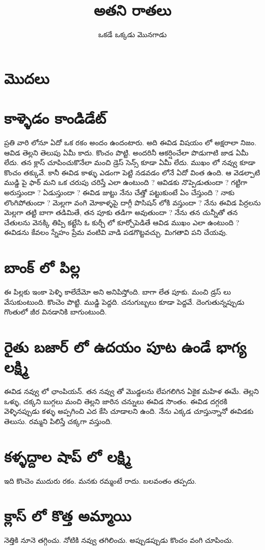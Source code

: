 \documentclass{article}
\title{అతని రాతలు}
\author{ఒకడే ఒక్కడు మొనగాడు}
\begin{document}
\maketitle
\section*{మొదలు}

\section*{కాళ్ళెడం కాండిడేట్}

ప్రతి వారి లోనూ ఏదో ఒక రకం అందం ఉందంటారు. అది ఈవిడ విషయం లో అక్షరాలా నిజం. 
ఆవిడ  తెల్లని తెలుపు ఏమీ కాదు.  కొంచం పొట్టి.  అందరినీ ఆకర్షించేలా పొడుగాటి జాడ ఏమీ లేదు.  తన క్లాస్ 
చూపించుకొనేలా మంచి డ్రెస్ సెన్స్ కూడా ఏమీ లేదు. ముఖం లో నవ్వు కూడా కొంచం తక్కువే. 
కానీ ఈవిడ కాళ్ళు ఎడంగా పెట్టి నడవడం లోనే ఏదో వింత ఉంది. ఆ వెడల్పాటి ముడ్డి పై ఫాఠ్ మని ఒక చరుపు 
చరిస్తే  ఎలా  ఉంటుంది ? ఆవిడకు నొప్పెడుతుందా ?  గట్టిగా అరుస్తుందా ? ఏడుస్తుందా ? 
ఈవిడ జుట్టు నేను చేత్తో పట్టుకుంటే ఏం చేస్తుంది ? నాకు లొంగిపోతుందా ? 
మెల్లగా వంగి మోకాళ్ళపై దాగ్గీ పొసిషన్ లోకి వస్తుందా ?
నేను ఈవిడ పిర్రలను మెల్లగా తట్టి బాగా తడిమితే, తన పూకు తడిగా అవుతుందా ?
నేను తన చున్నీతో తన చేతులను  వెనక్కి తిప్పి కట్టేసి ఓ కుర్చీ లో కూర్చోపెడితే ఆవిడ ముఖం ఎలా ఉంటుంది ?
ఈవిడను కేవలం స్నేహం ప్రేమ వంటివి వాడి పడగొట్టవచ్చు. మిగతావి పని చేయవు. 
\section*{బాంక్ లో పిల్ల}
ఈ పిల్లకు ఇంకా పెళ్ళి కాలేదేమో అని అనిపిస్తోంది. బాగా లేత పూకు. మంచి డ్రస్ లు వేసుకుంటుంది.
కొంచెం పొట్టి. ముడ్డి పెద్దది. చనుగుబ్బలు కూడా పెద్దవే. దెంగుతున్నప్పుడు గొంతులో జీర వినడానికి బాగుంటుంది. 
\section*{రైతు బజార్ లో ఉదయం పూట ఉండే భాగ్య లక్ష్మి}
ఈవిడ నవ్వు లో ఛాంపియన్. తన నవ్వు తో మొడ్డలను లేపగలిగిన ఏకైక మహిళ ఈమే. తెల్లని ఒళ్ళు, 
చక్కని బుగ్గలు మంచి తెల్లని జారిన చన్నులు ఈవిడ సొంతం. ఈవిడ దగ్గరకి వెళ్ళినప్పుడు కళ్ళు అప్పగించి 
ఎద కేసి చూడాలని ఉంది. నేను ఎక్కడ చూస్తున్నానో ఈవిడకు తెలుసు. రమ్మని పిలిస్తే చక్కగా వస్తుంది. 
\section*{కళ్ళద్దాల షాప్ లో లక్ష్మి}
ఇది కొంచెం ముదురు రకం. మనకు రమ్మంటే రాదు. బలవంతం తప్పదు. 
\section*{క్లాస్ లో కొత్త అమ్మాయి}
నెత్తికి నూనె తగ్గించు. నోటికి నవ్వు తగిలించు. అప్పుడప్పుడు కొంచం వంగి చూపించు.
\end{document}

